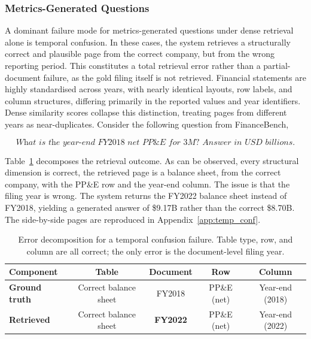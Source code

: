 \documentclass[12pt,twoside,maitrise]{dms}
\theoremstyle{definition}
\numberwithin{equation}{section}
\numberwithin{table}{chapter}
\numberwithin{figure}{chapter}
\begin{document}
\subsubsection{Metrics-Generated Questions}
\label{sec:fail_metgen}


A dominant failure mode for metrics-generated questions under dense retrieval alone is
temporal confusion. In these cases, the system retrieves a structurally correct and plausible page
from the correct company, but from the wrong reporting period. This constitutes a
total retrieval error rather than a partial-document failure, as the gold
filing itself is not retrieved. Financial statements are highly standardised across
years, with nearly identical layouts, row labels, and column structures, differing
primarily in the reported values and year identifiers. Dense similarity scores collapse
this distinction, treating pages from different years as near-duplicates. Consider the following question from FinanceBench,

\begin{equation*}
\textit{What is the year-end FY2018 net PP\&E for 3M? Answer in USD billions.}
\end{equation*}

\noindent Table~\ref{tab:temporal_confusion_decomp} decomposes the retrieval outcome. As can be observed, every structural dimension is correct, the retrieved page is a balance sheet, from the
correct company, with the PP\&E row and the year-end column. The issue is that the filing year is
wrong. The system returns the FY2022 balance sheet instead of FY2018, yielding a
generated answer of \$9.17B rather than the correct \$8.70B. The side-by-side pages are
reproduced in Appendix~\ref{app:temp_conf}.

\begin{table}[H]
\centering
\small
\begin{tabular}{lcccc}
\toprule
\textbf{Component} & \textbf{Table} & \textbf{Document} & \textbf{Row} & \textbf{Column} \\
\midrule
\textbf{Ground truth}
  & Correct balance sheet & FY2018 & PP\&E (net) & Year-end (2018) \\
\textbf{Retrieved}
  & Correct balance sheet & \textbf{FY2022} & PP\&E (net) & Year-end (2022) \\
\bottomrule
\end{tabular}
\caption{Error decomposition for a temporal confusion failure. Table type, row, and
  column are all correct; the only error is the document-level filing year.}
\label{tab:temporal_confusion_decomp}
\end{table}
\end{document}
